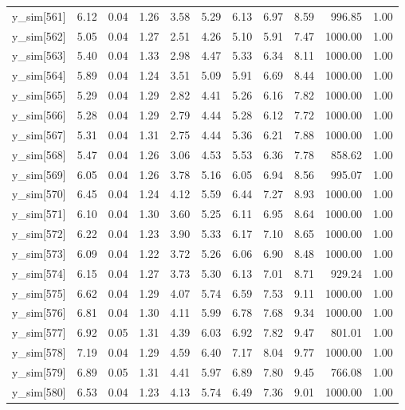 \begin{table}[ht]
\begin{tabular}{rrrrrrrrrrr}
  y\_sim[561] & 6.12 & 0.04 & 1.26 & 3.58 & 5.29 & 6.13 & 6.97 & 8.59 & 996.85 & 1.00 \\ 
  y\_sim[562] & 5.05 & 0.04 & 1.27 & 2.51 & 4.26 & 5.10 & 5.91 & 7.47 & 1000.00 & 1.00 \\ 
  y\_sim[563] & 5.40 & 0.04 & 1.33 & 2.98 & 4.47 & 5.33 & 6.34 & 8.11 & 1000.00 & 1.00 \\ 
  y\_sim[564] & 5.89 & 0.04 & 1.24 & 3.51 & 5.09 & 5.91 & 6.69 & 8.44 & 1000.00 & 1.00 \\ 
  y\_sim[565] & 5.29 & 0.04 & 1.29 & 2.82 & 4.41 & 5.26 & 6.16 & 7.82 & 1000.00 & 1.00 \\ 
  y\_sim[566] & 5.28 & 0.04 & 1.29 & 2.79 & 4.44 & 5.28 & 6.12 & 7.72 & 1000.00 & 1.00 \\ 
  y\_sim[567] & 5.31 & 0.04 & 1.31 & 2.75 & 4.44 & 5.36 & 6.21 & 7.88 & 1000.00 & 1.00 \\ 
  y\_sim[568] & 5.47 & 0.04 & 1.26 & 3.06 & 4.53 & 5.53 & 6.36 & 7.78 & 858.62 & 1.00 \\ 
  y\_sim[569] & 6.05 & 0.04 & 1.26 & 3.78 & 5.16 & 6.05 & 6.94 & 8.56 & 995.07 & 1.00 \\ 
  y\_sim[570] & 6.45 & 0.04 & 1.24 & 4.12 & 5.59 & 6.44 & 7.27 & 8.93 & 1000.00 & 1.00 \\ 
  y\_sim[571] & 6.10 & 0.04 & 1.30 & 3.60 & 5.25 & 6.11 & 6.95 & 8.64 & 1000.00 & 1.00 \\ 
  y\_sim[572] & 6.22 & 0.04 & 1.23 & 3.90 & 5.33 & 6.17 & 7.10 & 8.65 & 1000.00 & 1.00 \\ 
  y\_sim[573] & 6.09 & 0.04 & 1.22 & 3.72 & 5.26 & 6.06 & 6.90 & 8.48 & 1000.00 & 1.00 \\ 
  y\_sim[574] & 6.15 & 0.04 & 1.27 & 3.73 & 5.30 & 6.13 & 7.01 & 8.71 & 929.24 & 1.00 \\ 
  y\_sim[575] & 6.62 & 0.04 & 1.29 & 4.07 & 5.74 & 6.59 & 7.53 & 9.11 & 1000.00 & 1.00 \\ 
  y\_sim[576] & 6.81 & 0.04 & 1.30 & 4.11 & 5.99 & 6.78 & 7.68 & 9.34 & 1000.00 & 1.00 \\ 
  y\_sim[577] & 6.92 & 0.05 & 1.31 & 4.39 & 6.03 & 6.92 & 7.82 & 9.47 & 801.01 & 1.00 \\ 
  y\_sim[578] & 7.19 & 0.04 & 1.29 & 4.59 & 6.40 & 7.17 & 8.04 & 9.77 & 1000.00 & 1.00 \\ 
  y\_sim[579] & 6.89 & 0.05 & 1.31 & 4.41 & 5.97 & 6.89 & 7.80 & 9.45 & 766.08 & 1.00 \\ 
  y\_sim[580] & 6.53 & 0.04 & 1.23 & 4.13 & 5.74 & 6.49 & 7.36 & 9.01 & 1000.00 & 1.00 \\ 

\end{tabular}
\end{table}
